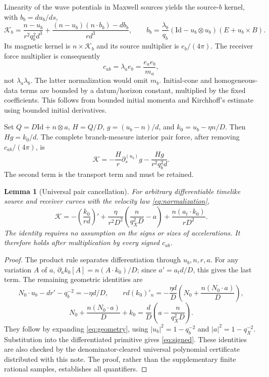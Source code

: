 \documentclass[11pt]{article}
\newcommand{\Id}{\mathrm{Id}}
\newtheorem{lemma}[theorem]{Lemma}
\theoremstyle{remark}\newtheorem{remark}[theorem]{Remark}
\numberwithin{equation}{section}
\begin{document}
Linearity of the wave potentials in Maxwell sources yields the source-$b$
kernel, with $b_b=du_b/ds$,
\begin{equation}\label{eq:kernel}
 \mathscr K_b=\frac{n-u_b}{r^2q_b^2d^3}
       +\frac{(n-u_b)(n\cdot b_b)-db_b}{rd^3},\qquad
 b_b=\frac{\lambda_b}{q_b}(\Id-u_b\otimes u_b)(E+u_b\times B).
\end{equation}
Its magnetic kernel is $n\times\mathscr K_b$ and its source multiplier
is $e_b/(4\pi)$. The receiver force multiplier is consequently
\begin{equation}\label{eq:pair-factor}
 c_{ab}=\lambda_a e_b=\frac{e_ae_b}{m_a},
\end{equation}
not $\lambda_a\lambda_b$. The latter normalization would omit $m_b$.
Initial-cone and homogeneous-data terms are bounded by a datum/horizon
constant, multiplied by the fixed coefficients. This follows from bounded
initial momenta and Kirchhoff's estimate using bounded initial derivatives.

Set $Q=D\Id+n\otimes a$, $H=Q/D$, $g=(u_b-n)/d$, and
$k_0=u_b-\eta n/D$. Then $Hg=k_0/d$. The complete branch-measure
interior pair force, after removing $c_{ab}/(4\pi)$, is
\[
 \mathcal K=-\frac Hr\partial_s^{(u_b)}g-\frac{Hg}{r^2q_b^2d}.
\]
The second term is the transport term and must be retained.

\begin{lemma}[Universal pair cancellation]\label{lem:cancellation}
For arbitrary differentiable timelike source and receiver curves with
the velocity law \eqref{eq:normalization},
\begin{equation}\label{eq:signed}
 \mathcal K=-\left(\frac{k_0}{rd}\right)'
  +\frac{\eta}{r^2D^2}\left(\frac{n}{q_X^2D}-a\right)
  +\frac{n(a_t\cdot k_0)}{rD^2}.
\end{equation}
The identity requires no assumption on the signs or sizes of accelerations.
It therefore holds after multiplication by every signed $c_{ab}$.
\end{lemma}
\begin{proof}
The product rule separates differentiation through $u_b,n,r,a$.
For any variation $A$ of $a$,
$\partial_a k_0[A]=n(A\cdot k_0)/D$; since $a'=a_t d/D$, this gives
the last term. The remaining geometric identities are
\[
 N_0\cdot u_b-dr'-q_b^{-2}=-\eta d/D,
 \qquad rd(k_0)'_n=-\frac{\eta d}{D}
       \left(N_0+\frac{n(N_0\cdot a)}D\right),
\]
\[
 N_0+\frac{n(N_0\cdot a)}D+k_0=
       \frac dD\left(a-\frac{n}{q_X^2D}\right).
\]
They follow by expanding \eqref{eq:geometry}, using
$|u_b|^2=1-q_b^{-2}$ and $|a|^2=1-q_X^{-2}$.
Substitution into the differentiated primitive gives \eqref{eq:signed}.
These identities are also checked by the denominator-cleared universal
polynomial certificate distributed with this note. The proof, rather than
the supplementary finite rational samples, establishes all quantifiers.
\end{proof}
\end{document}
